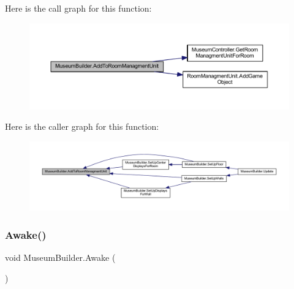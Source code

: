 Here is the call graph for this function\+:
\nopagebreak
\begin{figure}[H]
\begin{center}
\leavevmode
\includegraphics[width=350pt]{class_museum_builder_ad1991ecd1258a2eb6d020d3c429ad9c8_cgraph}
\end{center}
\end{figure}
Here is the caller graph for this function\+:
\nopagebreak
\begin{figure}[H]
\begin{center}
\leavevmode
\includegraphics[width=350pt]{class_museum_builder_ad1991ecd1258a2eb6d020d3c429ad9c8_icgraph}
\end{center}
\end{figure}
\mbox{\label{class_museum_builder_a846546ea2e9bf91bba2a166dc2b01e2d}} 
\subsubsection{\texorpdfstring{Awake()}{Awake()}}
{\footnotesize\ttfamily void Museum\+Builder.\+Awake (\begin{DoxyParamCaption}{ }\end{DoxyParamCaption})\hspace{0.3cm}{\ttfamily [private]}}

\mbox{\label{class_museum_builder_a2c456481ed3350f0113041111d63d0ec}} 
